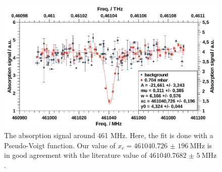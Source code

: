 \documentclass[a4paper,10pt]{scrartcl}
\begin{document}
\begin{figure}[H]
\centering
\includegraphics[width=\textwidth]{img/co_461}
\caption{The absorption signal around 461 MHz. Here, the fit is done with a Pseudo-Voigt function. Our value of $x_c=\SI{461040,726(196)}{\mega\hertz}$ is in good agreement with the literature value of $\SI{461040,7682(5)}{\mega\hertz}$.}
\label{fig:co_461}
\end{figure}
\end{document}
